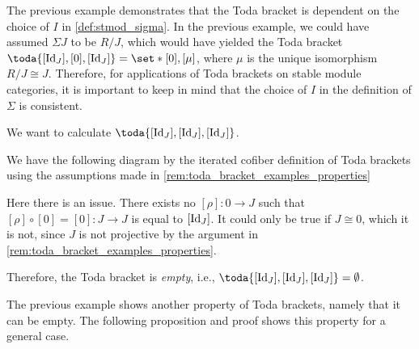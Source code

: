 The previous example demonstrates that the Toda bracket is dependent on the choice of \( I \) in \autoref{def:stmod_sigma}. In the previous example, we could have assumed \( \Sigma J \) to be \( R/J \), which would have yielded the Toda bracket \( \toda{[\Id_J], [0], [\Id_J]} = \set*{[0], [\mu]} \), where \( \mu \) is the unique isomorphism \( R/J \cong J \). Therefore, for applications of Toda brackets on stable module categories, it is important to keep in mind that the choice of \( I \) in the definition of \( \Sigma \) is consistent.

\begin{example}
	\label{ex:toda_bracket_2}
	We want to calculate \( \toda{[\Id_J], [\Id_J], [\Id_J]} \).

	We have the following diagram by the iterated cofiber definition of Toda brackets using the assumptions made in \autoref{rem:toda_bracket_examples_properties}
	\begin{center}
	\end{center}

	Here there is an issue. There exists no \( [\rho]: 0 \to J \) such that \( [\rho] \circ [0] = [0]: J \to J \) is equal to \( [\operatorname{Id}_J] \). It could only be true if \( J \cong 0 \), which it is not, since \( J \) is not projective by the argument in \autoref{rem:toda_bracket_examples_properties}.

	Therefore, the Toda bracket is \emph{empty}, i.e., \( \toda{[\Id_J], [\Id_J], [\Id_J]} = \emptyset \).
\end{example}

The previous example shows another property of Toda brackets, namely that it can be empty. The following proposition and proof shows this property for a general case.

